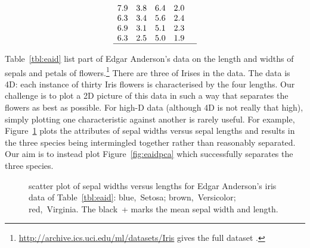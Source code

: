 \begin{example}
\begin{table}
\begin{equation*}
\begin{array}{rrrrl}
\\7.9&3.8&6.4&2.0&
\\6.3&3.4&5.6&2.4&
\\6.9&3.1&5.1&2.3&
\\6.3&2.5&5.0&1.9&
\\\hline
\end{array}
\end{equation*}
\end{table}
Table~\ref{tbl:eaid} list part of Edgar Anderson's data on the length and widths of sepals and petals of  flowers.\footnote{\url{http://archive.ics.uci.edu/ml/datasets/Iris} gives the full dataset \cite[]{Lichman2013}.}
There are three  of Irises in the data.
The data is 4D: each instance of thirty Iris flowers is characterised by the four lengths.
Our challenge is to plot a 2D picture of this data in such a way that separates the flowers as best as possible.
For high-D data (although 4D is not really that high), simply plotting one characteristic against another is rarely useful.
For example,  Figure~\ref{fig:eaid} plots the attributes of sepal widths versus sepal lengths and results in the three species being intermingled together rather than reasonably separated.
Our aim is to instead plot Figure~\ref{fig:eaidpca} which successfully separates the three species.

\begin{figure}
\centering
{}
\caption{scatter plot of sepal widths versus lengths for Edgar Anderson's iris data of Table~\ref{tbl:eaid}: blue,~Setosa; brown,~Versicolor; red,~Virginia.  
The black~+ marks the mean sepal width and length.}
\label{fig:eaid}
\end{figure}


\end{example}
